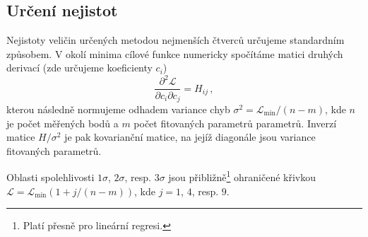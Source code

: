 \subsection*{Určení nejistot}

Nejistoty veličin určených metodou nejmenších čtverců určujeme standardním způsobem.\todocite{}
V okolí minima cílové funkce numericky spočítáme matici druhých derivací (zde určujeme koeficienty $c_i$)
\begin{equation}
    \frac{\partial^2 \mathcal{L}}{\partial c_i \partial c_j} = H_{ij} \,,
\end{equation}
kterou následně normujeme odhadem variance chyb $\sigma^2 = \mathcal{L}_\textrm{min}/(n-m)$, kde $n$ je počet měřených bodů a $m$ počet fitovaných parametrů parametrů.
Inverzí matice $H/\sigma^2$ je pak kovarianční matice, na jejíž diagonále jsou variance fitovaných parametrů.

Oblasti spolehlivosti $1\sigma$, $2\sigma$, resp. $3\sigma$ jsou přibližně\footnote{Platí přesně pro lineární regresi.} ohraničené křivkou $\mathcal{L}=\mathcal{L}_\textrm{min}(1+j/(n-m))$, kde $j=1$, $4$, resp. $9$.
